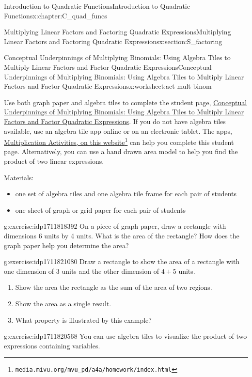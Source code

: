 \documentclass[oneside,10pt,]{book}
\numberwithin{equation}{chapter}
\begin{document}
\begin{chapterptx}{Introduction to Quadratic Functions}{}{Introduction to Quadratic Functions}{}{}{x:chapter:C_quad_funcs}
\begin{sectionptx}{Multiplying Linear Factors and Factoring Quadratic Expressions}{}{Multiplying Linear Factors and Factoring Quadratic Expressions}{}{}{x:section:S_factoring}
\begin{worksheet-subsection}{Conceptual Underpinnings of Multiplying Binomials: Using Algebra Tiles to Multiply Linear Factors and Factor Quadratic Expressions}{}{Conceptual Underpinnings of Multiplying Binomials: Using Algebra Tiles to Multiply Linear Factors and Factor Quadratic Expressions}{}{}{x:worksheet:act-mult-binom}
\begin{introduction}{}
Use both graph paper and algebra tiles to complete the student page, \hyperref[x:worksheet:act-mult-binom]{Conceptual Underpinnings of Multiplying Binomials: Using Algebra Tiles to Multiply Linear Factors and Factor Quadratic Expressions}. If you do not have algebra tiles available, use an algebra tile app online or on an electronic tablet. The apps, \href{http://media.mivu.org/mvu_pd/a4a/homework/index.html}{Multiplication Activities, on this website}\footnote{\nolinkurl{media.mivu.org/mvu_pd/a4a/homework/index.html}\label{g:fn:idp1711820952}} can help you complete this student page. Alternatively, you can use a hand drawn area model to help you find the product of two linear expressions.%
\par
Materials:%
\begin{itemize}[label=\textbullet]
\item{}one set of algebra tiles and one algebra tile frame for each pair of students%
\item{}one sheet of graph or grid paper for each pair of students%
\end{itemize}
%
\end{introduction}%
\begin{divisionexercise}{1}{}{}{g:exercise:idp1711818392}%
On a piece of graph paper, draw a rectangle with dimensions 6 units by 4 units. What is the area of the rectangle? How does the graph paper help you determine the area?%
\end{divisionexercise}%
\begin{divisionexercise}{2}{}{}{g:exercise:idp1711821080}%
Draw a rectangle to show the area of a rectangle with one dimension of 3 units and the other dimension of \(4 + 5\) units.%
\begin{enumerate}[font=\bfseries,label=(\alph*),ref=\alph*]
\item{}Show the area the rectangle as the sum of the area of two regions.%
\item{}Show the area as a single result.%
\item{}What property is illustrated by this example?%
\end{enumerate}
\end{divisionexercise}%
\begin{divisionexercise}{3}{}{}{g:exercise:idp1711820568}%
You can use algebra tiles to visualize the product of two expressions containing variables.%
\begin{enumerate}[font=\bfseries,label=(\alph*),ref=\alph*]

\end{enumerate}
\end{divisionexercise}
\end{worksheet-subsection}
\end{sectionptx}
\end{chapterptx}
\end{document}
